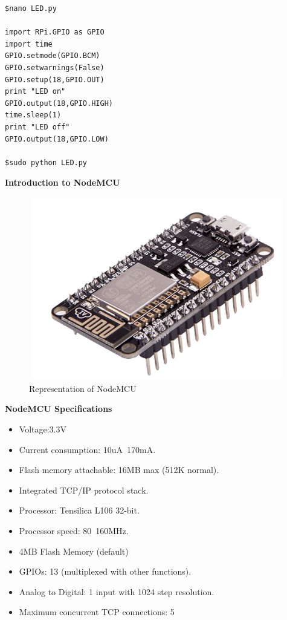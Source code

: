 \documentclass[12pt,a4paper]{article}
\begin{document}
\begin{lstlisting}
$nano LED.py

import RPi.GPIO as GPIO
import time
GPIO.setmode(GPIO.BCM)
GPIO.setwarnings(False)
GPIO.setup(18,GPIO.OUT)
print "LED on"
GPIO.output(18,GPIO.HIGH)
time.sleep(1)
print "LED off"
GPIO.output(18,GPIO.LOW)

$sudo python LED.py

\end{lstlisting}

\begin{center}
\large \textbf{Introduction to NodeMCU}
\end{center}
\begin{figure}[h!]
    \centering
	\includegraphics[width=15cm, height=8cm]{Introduction/16.png}
	\caption{Representation of NodeMCU}
\end{figure}

\textbf{NodeMCU Specifications} 
\begin{itemize}[noitemsep,nolistsep]
    \item Voltage:3.3V
    \item Current consumption: 10uA~170mA.
    \item Flash memory attachable: 16MB max (512K normal).
    \item Integrated TCP/IP protocol stack.
    \item Processor: Tensilica L106 32-bit.
    \item Processor speed: 80~160MHz.
    \item 4MB Flash Memory (default)
    \item GPIOs: 13 (multiplexed with other functions).
    \item Analog to Digital: 1 input with 1024 step resolution.
    \item Maximum concurrent TCP connections: 5
\end{itemize}
\vspace{5mm}
\end{document}
